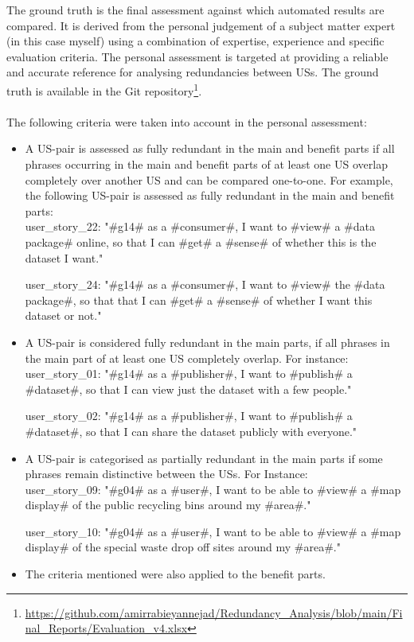 The ground truth is the final assessment against which automated results are compared. It is derived from the personal judgement of a subject matter expert (in this case myself) using a combination of expertise, experience and specific evaluation criteria. The personal assessment is targeted at providing a reliable and accurate reference for analysing redundancies between USs. The ground truth is available in the Git repository\footnote{\href{https://github.com/amirrabieyannejad/Redundancy_Analysis/blob/main/Final_Reports/Evaluation_v4.xlsx}{https://github.com/amirrabieyannejad/Redundancy\_Analysis/blob/main/Final\_Reports/Evaluation\_v4.xlsx}}.\\\\
	The following criteria were taken into account in the personal assessment:
	\begin{itemize}
		\item A US-pair is assessed as fully redundant in the main and benefit parts if all phrases occurring in the main and benefit parts of at least one US overlap completely over another US and can be compared one-to-one. For example, the following US-pair is assessed as fully redundant in the main and benefit parts:\\
		user\_story\_22: "\#g14\# as a \#consumer\#, I want to \#view\# a \#data package\# online, so that I can \#get\# a \#sense\# of whether this is the dataset I want."
		
		user\_story\_24: "\#g14\# as a \#consumer\#, I want to \#view\# the \#data package\#, so that that I can \#get\# a \#sense\# of whether I want this dataset or not."
		
		\item A US-pair is considered fully redundant in the main parts, if all phrases in the main part of at least one US completely overlap. For instance:\\
		user\_story\_01: "\#g14\# as a \#publisher\#, I want to \#publish\# a \#dataset\#, so that I can view just the dataset with a few people."
		
		user\_story\_02: "\#g14\# as a \#publisher\#, I want to \#publish\# a \#dataset\#, so that I can share the dataset publicly with everyone."
		
		\item A US-pair is categorised as partially redundant in the main parts if some phrases remain distinctive between the USs. For Instance:\\
		user\_story\_09: "\#g04\# as a \#user\#, I want to be able to \#view\# a \#map display\# of the public recycling bins around my \#area\#."
		
		user\_story\_10: "\#g04\# as a \#user\#, I want to be able to \#view\# a \#map display\# of the special waste drop off sites around my \#area\#."
		
		\item The criteria mentioned were also applied to the benefit parts.
	\end{itemize}
